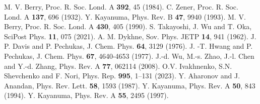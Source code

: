 
\begin{thebibliography}{99}
    M. V. Berry, Proc. R. Soc. Lond. A {\bf 392}, 45 (1984).
   C. Zener, Proc. R. Soc. Lond. A {\bf 137}, 696 (1932).
   Y. Kayanuma, Phys. Rev. B {\bf 47}, 9940 (1993).
   M. V. Berry, Proc. R. Soc. Lond. A {\bf 430}, 405 (1990).
   S. Takayoshi, J. Wu and T. Oka, SciPost Phys. {\bf 11}, 075 (2021).
   A. M. Dykhne, Sov. Phys. JETP {\bf 14}, 941 (1962).
   J. P. Davis and P. Pechukas, J. Chem. Phys. {\bf 64}, 3129 (1976).
   J. -T. Hwang and P. Pechukas, J. Chem. Phys. {\bf 67}, 4640-4653 (1977).
   J.-d. Wu, M.-s. Zhao, J.-l. Chen and Y.-d. Zhang, Phys. Rev. A {\bf 77}, 062114 (2008).
   O.V. Ivakhnenko, S.N. Shevchenko and F. Nori, Phys. Rep. {\bf 995}, 1–131 (2023).
   Y. Aharonov and J. Anandan, Phys. Rev. Lett. {\bf 58}, 1593 (1987).
   Y. Kayanuma, Phys. Rev. A {\bf 50}, 843 (1994).
   Y. Kayanuma, Phys. Rev. A {\bf 55}, 2495 (1997).
\end{thebibliography}